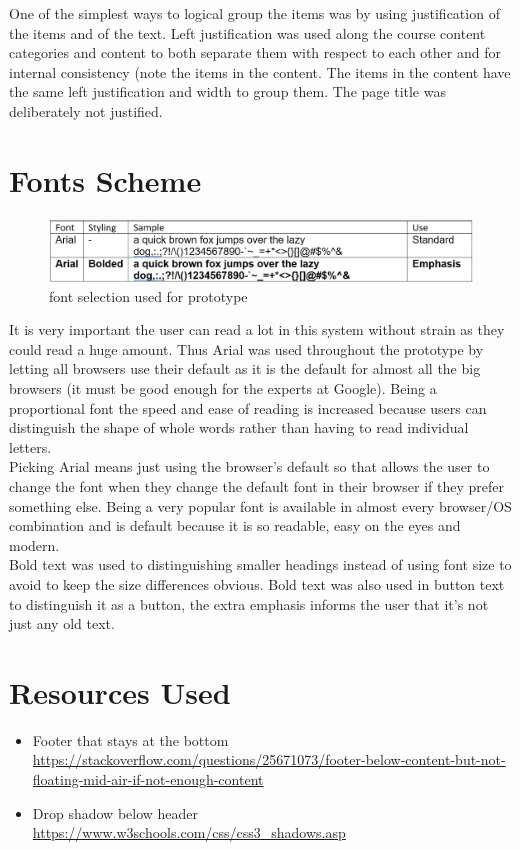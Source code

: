 \documentclass[10pt,a4paper]{article}
\begin{document}
	One of the simplest ways to logical group the items was by using justification of the items and of the text. Left justification was used along the course content categories and content to both separate them with respect to each other and for internal consistency (note the items in the content. The items in the content have the same left justification and width to group them. The page title was deliberately not justified.\\
	
		
\section{Fonts Scheme}
	\begin{figure}[H]
		\centering
		\includegraphics[width=\textwidth]{Fonts.PNG}
		\caption{font selection used for prototype}
		\label{fig:color}
	\end{figure}
		It is very important the user can read a lot in this system without strain as they could read a huge amount. Thus Arial was used throughout the prototype by letting all browsers use their default as it is the default for almost all the big browsers (it must be good enough for the experts at Google). Being a proportional font the speed and ease of reading is increased because users can distinguish the shape of whole words rather than having to read individual letters.\\
	
	Picking Arial means just using the browser's default so that allows the user to change the font when they change the default font in their browser if they prefer something else. Being a very popular font is available in almost every browser/OS combination and is default because it is so readable, easy on the eyes and modern. \\
	
	Bold text was used to distinguishing smaller headings instead of using font size to avoid to keep the size differences obvious. Bold text was also used in button text to distinguish it as a button, the extra emphasis informs the user that it's not just any old text.
	
	
\section{Resources Used}
	\begin{itemize}
		\item Footer that stays at the bottom\\ \url{https://stackoverflow.com/questions/25671073/footer-below-content-but-not-floating-mid-air-if-not-enough-content}
		\item Drop shadow below header\\ \url{https://www.w3schools.com/css/css3_shadows.asp}	
	\end{itemize}
\end{document}
